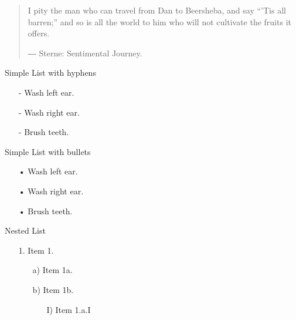 \documentclass[a5paper]{book}
\begin{document}
\begin{german}
\begin{quotation}
{\noindent}I pity the man who can travel from Dan to Beersheba, and say “’Tis
all barren;” and so is all the world to him who will not cultivate
the fruits it offers.\par

\nopagebreak

\raggedleft ― Sterne: Sentimental Journey.\\
\end{quotation}

Simple List with hyphens\par

\begin{itemize}
\item[-] 
Wash left ear.\par

\item[-] 
Wash right ear.\par

\item[-] 
Brush teeth.\par
\end{itemize}

Simple List with bullets\par

\begin{itemize}
\item[•] 
Wash left ear.\par

\item[•] 
Wash right ear.\par

\item[•] 
Brush teeth.\par
\end{itemize}

Nested List\par

\begin{itemize}
\item[1.] 
Item 1.\par

\begin{itemize}
\item[a)] 
Item 1a.\par

\item[b)] 
Item 1b.\par

\begin{itemize}
\item[I)] 
Item 1.a.I\par


\end{itemize}
\end{itemize}
\end{itemize}
\end{german}
\end{document}
